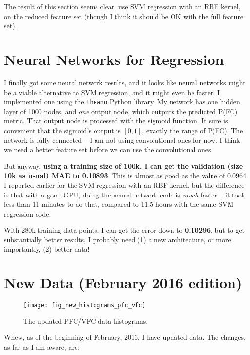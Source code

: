 \documentclass[a4paper, 11pt]{article}
\begin{document}
The result of this section seems clear: use SVM regression with an RBF kernel, on the reduced
feature set (though I think it should be OK with the full feature set).




\section{Neural Networks for Regression}

I finally got some neural network results, and it looks like neural networks might be a viable
alternative to SVM regression, and it might even be faster. I implemented one using the
\texttt{theano} Python library. My network has one hidden layer of 1000 nodes, and \emph{one} output
node, which outputs the predicted P(FC) metric. That output node is processed with the sigmoid
function. It sure is convenient that the sigmoid's output is $[0,1]$, exactly the range of P(FC).
The network is fully connected -- I am not using convolutional ones for now. I think we need a
better feature set before we can use the convolutional ones.

But anyway, \textbf{using a training size of 100k, I can get the validation (size 10k as usual) MAE
to 0.10893}. This is almost as good as the value of 0.0964 I reported earlier for the SVM regression
with an RBF kernel, but the difference is that with a good GPU, doing the neural network code is
\emph{much} faster -- it took less than 11 minutes to do that, compared to 11.5 hours with the same
SVM regression code.

With 280k training data points, I can get the error down to \textbf{0.10296}, but to get
substantially better results, I probably need (1) a new architecture, or more importantly, (2)
better data!





\section{New Data (February 2016 edition)}

\begin{figure}[h]
  \centering
  \texttt{[image: fig\_new\_histograms\_pfc\_vfc]}
  \caption{The updated PFC/VFC data histograms.}
  \label{fig:updated_pfc_vfc}
\end{figure}

Whew, as of the beginning of February, 2016, I have updated data. The changes, as far as I am aware,
are:
\end{document}
